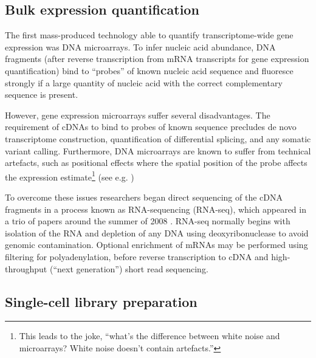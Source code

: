 \subsection{Bulk expression quantification}




The first mass-produced technology able to quantify transcriptome-wide gene expression was DNA microarrays. To infer nucleic acid abundance, DNA fragments (after reverse transcription from mRNA transcripts for gene expression quantification) bind to ``probes'' of known nucleic acid sequence and fluoresce strongly if a large quantity of nucleic acid with the correct complementary sequence is present.

However, gene expression microarrays suffer several disadvantages. The requirement of cDNAs to bind to probes of known sequence precludes de novo transcriptome construction, quantification of differential splicing, and any somatic variant calling. Furthermore, DNA microarrays are known to suffer from technical artefacts, such as positional effects where the spatial position of the probe affects the expression estimate\footnote{
This leads to the joke, ``what's the difference between white noise and microarrays? White noise doesn't contain artefacts.''
} (see e.g. \cite{petri2012detection,yu2006positional})

To overcome these issues researchers began direct sequencing of the cDNA fragments in a process known as RNA-sequencing (RNA-seq), which appeared in a trio of papers around the summer of 2008 \cite{mortazavi2008mapping,nagalakshmi2008transcriptional,lister2008highly}. RNA-seq normally begins with isolation of the RNA and depletion of any DNA using deoxyribonuclease to avoid genomic contamination. Optional enrichment of mRNAs may be performed using filtering for polyadenylation, before reverse transcription to cDNA and high-throughput (``next generation'') short read sequencing.


\subsection{Single-cell library preparation} \label{sec:sc_lib_prep}

